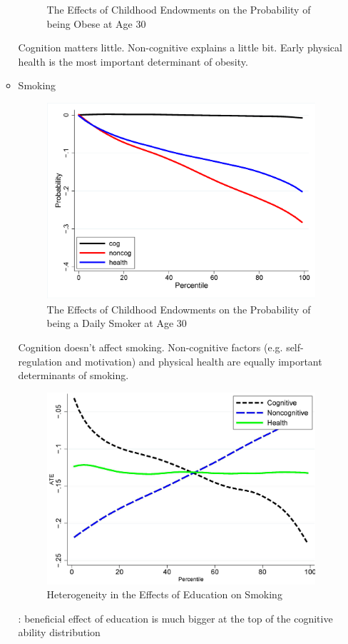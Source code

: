 \begin{itemize}
\begin{itemize}
\begin{figure}[H]
                            \caption{The Effects of Childhood Endowments on the Probability of being Obese at Age 30}
                        \end{figure} 
                        Cognition matters little. Non-cognitive explains a little bit. Early physical health is the most important determinant of obesity.
                    \item Smoking
                        \begin{figure}[H]%
                            \centering
                            \includegraphics[width=4in]{images/ch3/45.png}
                            \caption{The Effects of Childhood Endowments on the Probability of being a Daily Smoker at Age 30}
                        \end{figure} 
                        Cognition doesn't affect smoking. Non-cognitive factors (e.g. self-regulation and motivation) and physical health are equally important determinants of smoking.
                        \begin{figure}[H]%
                            \centering
                            \includegraphics[width=4in]{images/ch3/47.png}
                            \caption{Heterogeneity in the Effects of Education on Smoking}
                        \end{figure} 
                        : beneficial effect of education is much bigger at the top of the cognitive ability distribution
                \end{itemize}
            \end{itemize}

